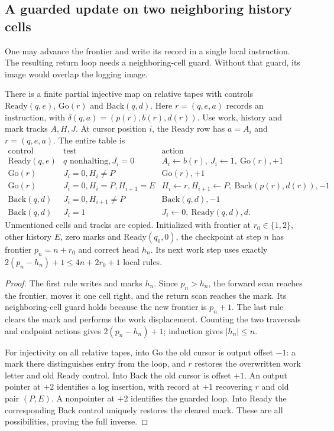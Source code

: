 \subsection{A guarded update on two neighboring history cells}

One may advance the frontier and write its record in a single local
instruction.  The resulting return loop needs a neighboring-cell guard.
Without that guard, its image would overlap the logging image.

\begin{lemma}\label{lem:bb-window-compiler}
There is a finite partial injective map on relative tapes with controls
$\mathrm{Ready}(q,e)$, $\mathrm{Go}(r)$ and $\mathrm{Back}(q,d)$.
Here $r=(q,e,a)$ records an instruction, with
$\delta(q,a)=(p(r),b(r),d(r))$.
Use work, history and mark tracks $A,H,J$.  At cursor position $i$,
the Ready row has $a=A_i$ and $r=(q,e,a)$.  The entire table is
\[
\begin{array}{c|l|l}
\text{control}&\text{test}&\text{action}\\\hline
\mathrm{Ready}(q,e)&q\text{ nonhalting},J_i=0
 &A_i\gets b(r),\ J_i\gets1,\ \mathrm{Go}(r),+1\\
\mathrm{Go}(r)&J_i=0,H_i\ne P&\mathrm{Go}(r),+1\\
\mathrm{Go}(r)&J_i=0,H_i=P,H_{i+1}=E
 &H_i\gets r,H_{i+1}\gets P,\ \mathrm{Back}(p(r),d(r)),-1\\
\mathrm{Back}(q,d)&J_i=0,H_{i+1}\ne P&\mathrm{Back}(q,d),-1\\
\mathrm{Back}(q,d)&J_i=1&J_i\gets0,\ \mathrm{Ready}(q,d),d.
\end{array}
\]
Unmentioned cells and tracks are copied.  Initialized with frontier
at $r_0\in\{1,2\}$, other history $E$, zero marks and
$\mathrm{Ready}(q_0,0)$, the checkpoint at step $n$ has frontier
$p_n=n+r_0$ and correct head
$h_n$.  Its next work step uses exactly
$2(p_n-h_n)+1\le4n+2r_0+1$ local rules.
\end{lemma}
\begin{proof}
The first rule writes and marks $h_n$.  Since $p_n>h_n$,
the forward scan reaches the frontier, moves it one cell right, and
the return scan reaches the mark.  Its neighboring-cell guard holds
because the new frontier is $p_n+1$.  The last rule clears the mark
and performs the work displacement.  Counting the two traversals and
endpoint actions gives $2(p_n-h_n)+1$; induction gives $|h_n|\le n$.

For injectivity on all relative tapes, into Go the old cursor is
output offset $-1$: a mark there distinguishes entry from the loop,
and $r$ restores the overwritten work letter and old Ready control.
Into Back the old cursor is offset $+1$.  An output pointer at $+2$
identifies a log insertion, with record at $+1$ recovering $r$ and
old pair $(P,E)$.  A nonpointer at $+2$ identifies the guarded loop.
Into Ready the corresponding Back control uniquely restores the
cleared mark.  These are all possibilities, proving the full inverse.
\end{proof}

